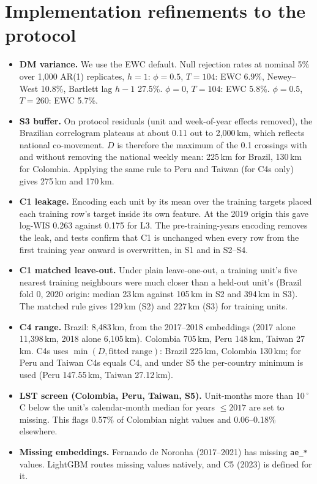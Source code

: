 \documentclass[11pt]{article}
\begin{document}
\section{Implementation refinements to the protocol}
\label{app:refinements}
\begin{itemize}
  \item \textbf{DM variance.} We use the EWC default. Null rejection rates at nominal 5\% over 1{,}000 AR(1) replicates, $h=1$:
  $\phi=0.5$, $T=104$: EWC 6.9\%, Newey--West 10.8\%, Bartlett lag $h-1$ 27.5\%. $\phi=0$, $T=104$: EWC 5.8\%.
  $\phi=0.5$, $T=260$: EWC 5.7\%.
  \item \textbf{S3 buffer.} On protocol residuals (unit and week-of-year effects removed), the Brazilian correlogram plateaus at
  about 0.11 out to 2{,}000\,km, which reflects national co-movement. $D$ is therefore the maximum of the 0.1 crossings
  with and without removing the national weekly mean: 225\,km for Brazil, 130\,km for Colombia. Applying the same rule
  to Peru and Taiwan (for C4s only) gives 275\,km and 170\,km.
  \item \textbf{C1 leakage.} Encoding each unit by its mean over the training targets placed each training row's
  target inside its own feature. At the 2019 origin this gave log-WIS 0.263 against 0.175 for L3. The pre-training-years
  encoding removes the leak, and tests confirm that C1 is unchanged when every row from the first training year
  onward is overwritten, in S1 and in S2--S4.
  \item \textbf{C1 matched leave-out.} Under plain leave-one-out, a training unit's five nearest training neighbours were
  much closer than a held-out unit's (Brazil fold 0, 2020 origin: median 23\,km against 105\,km in S2 and 394\,km in S3).
  The matched rule gives 129\,km (S2) and 227\,km (S3) for training units.
  \item \textbf{C4 range.} Brazil: 8{,}483\,km, from the 2017--2018 embeddings (2017 alone 11{,}398\,km, 2018 alone
  6{,}105\,km). Colombia 705\,km, Peru 148\,km, Taiwan 27\,km. C4s uses $\min(D,\text{fitted range})$: Brazil 225\,km,
  Colombia 130\,km; for Peru and Taiwan C4s equals C4, and under S5 the per-country minimum is used
  (Peru 147.55\,km, Taiwan 27.12\,km).
  \item \textbf{LST screen (Colombia, Peru, Taiwan, S5).} Unit-months more than 10\,$^\circ$C below the unit's
  calendar-month median for years $\leq 2017$ are set to missing. This flags 0.57\% of Colombian night values and
  0.06--0.18\% elsewhere.
  \item \textbf{Missing embeddings.} Fernando de Noronha (2017--2021) has missing \texttt{ae\_*} values. LightGBM routes
  missing values natively, and C5 (2023) is defined for it.
\end{itemize}
\end{document}
